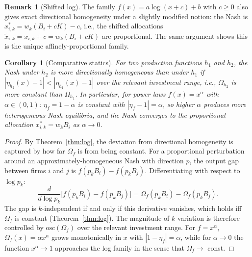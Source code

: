 \documentclass{article}
\newtheorem{corollary}{Corollary}
\theoremstyle{definition}
\newtheorem{remark}{Remark}
\begin{document}
\begin{remark}[Shifted log]
The family $f(x) = a\log(x + c) + b$ with $c \geq 0$ also gives exact
directional homogeneity under a slightly modified notion: the Nash is
$x_{i,k}^* = w_k(B_i + cK) - c$, i.e., the shifted allocations
$\tilde x_{i,k} = x_{i,k} + c = w_k(B_i + cK)$ are proportional.  The
same argument shows this is the unique affinely-proportional family.
\end{remark}

\begin{corollary}[Comparative statics]\label{cor:comp}
For two production functions $h_1$ and $h_2$, the Nash under $h_2$ is
more directionally homogeneous than under $h_1$ if $|\eta_{h_2}(x) - 1|
< |\eta_{h_1}(x) - 1|$ over the relevant investment range, i.e.,
$\Omega_{h_2}$ is more constant than $\Omega_{h_1}$.  In particular, for
power laws $f(x) = x^\alpha$ with $\alpha \in (0, 1)$:
$\eta_f = 1 - \alpha$ is constant with $|\eta_f - 1| = \alpha$, so higher
$\alpha$ produces more heterogeneous Nash equilibria, and the Nash converges
to the proportional allocation $x_{i,k}^* = w_k B_i$ as $\alpha \to 0$.
\end{corollary}

\begin{proof}
By Theorem~\ref{thm:log}, the deviation from directional homogeneity is
captured by how far $\Omega_f$ is from being constant.  For a proportional
perturbation around an approximately-homogeneous Nash with direction $p$,
the output gap between firms $i$ and $j$ is $f(p_k B_i) - f(p_k B_j)$.
Differentiating with respect to $\log p_k$:
\[
  \frac{d}{d\log p_k}\bigl[f(p_k B_i) - f(p_k B_j)\bigr]
  = \Omega_f(p_k B_i) - \Omega_f(p_k B_j).
\]
The gap is $k$-independent if and only if this derivative vanishes, which holds
iff $\Omega_f$ is constant (Theorem~\ref{thm:log}).  The magnitude of $k$-variation
is therefore controlled by $\mathrm{osc}(\Omega_f)$ over the relevant investment range.
For $f = x^\alpha$, $\Omega_f(x) = \alpha x^\alpha$ grows monotonically in $x$ with
$|1 - \eta_f| = \alpha$, while for $\alpha \to 0$ the function $x^\alpha \to 1$
approaches the log family in the sense that $\Omega_f \to $ const.
\end{proof}
\end{document}
